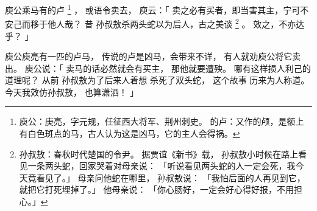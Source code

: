 
\switchcolumn*[\section{}]

庾公乘马有的卢%
\footnote{%
    庾公：庚亮，字元规，任征西大将军、荆州刺史。
    的卢：又作的颅，是额上有白色斑点的马，古人认为这是凶马，它的主人会得祸。
}%
，
或语令卖去，
庾云：「
    卖之必有买者，即当害其主，宁可不安己而移于他人哉？
    昔
    孙叔敖杀两头蛇以为后人，古之美谈%
    \footnote{%
        孙叔敖：春秋时代楚国的令尹。
                据贾谊《新书》载，
                孙叔敖小时候在路上看见一条两头蛇，回家哭着对母亲说：
                「听说看见两头蛇的人一定会死，我今天竟看见了。」
                母亲问他蛇在哪里，
                孙叔敖说：
                「我怕后面的人再见到它，就把它打死埋掉了。」
                他母亲说：
                「你心肠好，一定会好心得好报，不用担心。」
    }%
    。
    效之，不亦达乎？
」

\switchcolumn

庾公庾亮有一匹的卢马，
传说的卢是凶马，会带来不详，
有人就劝庾公将它卖出。
庾公说：「
    卖马的话必然就会有买主，
    那他就要遭殃。
    哪有这样损人利己的道理呢？
    从前
    孙叔敖为了后来人着想
    杀死了双头蛇，
    这个故事
    历来为人称道。
    今天我效仿孙叔敖，
    也算潇洒！
」

